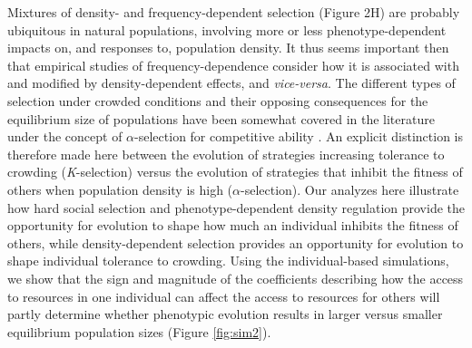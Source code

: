 \documentclass{article}
\begin{document}
Mixtures of density- and frequency-dependent selection (Figure 2H) are probably ubiquitous in natural populations, involving more or less phenotype-dependent impacts on, and responses to, population density. It thus seems important then that empirical studies of frequency-dependence consider how it is associated with and modified by density-dependent effects, and \textit{vice-versa}. The different types of selection under crowded conditions and their opposing consequences for the equilibrium size of populations have been somewhat covered in the literature under the concept of ${\alpha}$-selection for competitive ability \citep{Joshi2001}. An explicit distinction is therefore made here between the evolution of strategies increasing tolerance to crowding (\textit{K}-selection) versus the evolution of strategies that inhibit the fitness of others when population density is high (${\alpha}$-selection). Our analyzes here illustrate how hard social selection and phenotype-dependent density regulation provide the opportunity for evolution to shape how much an individual inhibits the fitness of others, while density-dependent selection provides an opportunity for evolution to shape individual tolerance to crowding. Using the individual-based simulations, we show that the sign and magnitude of the coefficients describing how the access to resources in one individual can affect the access to resources for others will partly determine whether phenotypic evolution results in larger versus smaller equilibrium population sizes (Figure \ref{fig:sim2}). 
\end{document}
